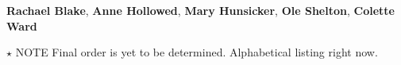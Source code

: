 \textbf{Rachael Blake}, 
\textbf{Anne Hollowed}, 
\textbf{Mary Hunsicker}, 
\textbf{Ole Shelton}, 
\textbf{Colette Ward} 


$\star$ NOTE Final order is yet to be determined. Alphabetical listing right now. 
